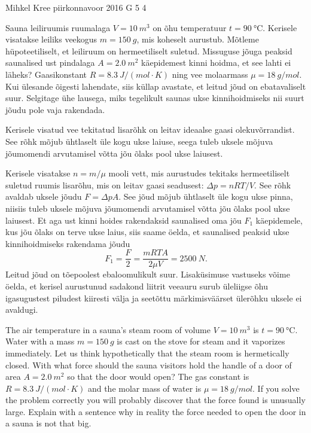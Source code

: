 {Mihkel Kree} %
{piirkonnavoor} %
{2016} %
{G 5} %
{4} %
{
\ifStatement
Sauna leiliruumis ruumalaga $V=\SI{10}{m^3}$ on õhu temperatuur $t=\SI{90}{\celsius}$. Kerisele visatakse leiliks veekogus $m=\SI{150}{g}$, mis koheselt aurustub. Mõtleme hüpoteetiliselt, et leiliruum on hermeetiliselt suletud. Missuguse jõuga peaksid saunalised ust pindalaga $A=\SI{2,0}{m^2}$ käepidemest kinni hoidma, et see lahti ei läheks? Gaasikonstant $R=\SI{8.3}{J \per (mol\!\cdot\! K)}$ ning vee molaarmass $\mu=\SI{18}{g\per mol}$. Kui ülesande õigesti lahendate, siis küllap avastate, et leitud jõud on ebatavaliselt suur. Selgitage ühe lausega, miks tegelikult saunas ukse kinnihoidmiseks nii suurt jõudu pole vaja rakendada.
\fi


\ifHint
Kerisele visatud vee tekitatud lisarõhk on leitav ideaalse gaasi olekuvõrrandist. See rõhk mõjub ühtlaselt üle kogu ukse laiuse, seega tuleb uksele mõjuva jõumomendi arvutamisel võtta jõu õlaks pool ukse laiusest.
\fi


\ifSolution
Kerisele visatakse $n=m/\mu$ mooli vett, mis aurustudes tekitaks hermeetiliselt suletud ruumis lisarõhu, mis on leitav gaasi seadusest: $\Delta p = nRT/V$. See rõhk avaldab uksele jõudu $F=\Delta p A$. See jõud mõjub ühtlaselt üle kogu ukse pinna, niisiis tuleb uksele mõjuva jõumomendi arvutamisel võtta jõu õlaks pool ukse laiusest. Et aga ust kinni hoides rakendaksid saunalised oma jõu $F_1$ käepidemele, kus jõu õlaks on terve ukse laius, siis saame öelda, et saunalised peaksid ukse kinnihoidmiseks rakendama jõudu
\[F_1 = \frac{F}{2} = \frac{mRTA}{2 \mu V} = \SI{2500}{N}.\]
Leitud jõud on tõepoolest ebaloomulikult suur. Lisaküsimuse vastuseks võime öelda, et kerisel aurustunud sadakond liitrit veeauru surub üleliigse õhu igasugustest piludest kiiresti välja ja seetõttu märkimisväärset ülerõhku uksele ei avaldugi.
\fi


\ifEngStatement
The air temperature in a sauna’s steam room of volume $V=\SI{10}{m^3}$ is $t=\SI{90}{\celsius}$. Water with a mass $m=\SI{150}{g}$ is cast on the stove for steam and it vaporizes immediately. Let us think hypothetically that the steam room is hermetically closed. With what force should the sauna visitors hold the handle of a door of area $A=\SI{2,0}{m^2}$ so that the door would open? The gas constant is $R=\SI{8.3}{J \per (mol\!\cdot\! K)}$ and the molar mass of water is $\mu=\SI{18}{g\per mol}$. If you solve the problem correctly you will probably discover that the force found is unusually large. Explain with a sentence why in reality the force needed to open the door in a sauna is not that big.
\fi


}
